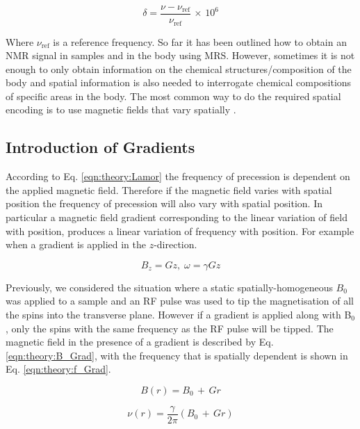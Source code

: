 \begin{equation}
    \delta = \frac{\nu - \nu_{\textrm{ref}}}{\nu_\textrm{ref}} \, \times \, 10^6
    \label{eqn:theory:chemshift}
\end{equation}

Where $\nu_{\textrm{ref}}$ is a reference frequency. So far it has been outlined how to obtain an \ac{NMR} signal in samples and in the body using MRS. However, sometimes it is not enough to only obtain information on the chemical structures/composition of the body and spatial information is also needed to interrogate chemical compositions of specific areas in the body. The most common way to do the required spatial encoding is to use magnetic fields that vary spatially \cite{Haacke2014MagneticDesign}. 

\subsection{Introduction of Gradients}

According to Eq. \ref{eqn:theory:Lamor} the frequency of precession is dependent on the applied magnetic field. Therefore if the magnetic field varies with spatial position the frequency of precession will also vary with spatial position. In particular a magnetic field gradient corresponding to the linear variation of field with position, produces a linear variation of frequency with position. For example when a gradient is applied in the $z$-direction.

\begin{equation}
    B_z = Gz,\; \omega = \gamma Gz 
\end{equation}

Previously, we considered the situation where a static spatially-homogeneous $B_0$ was applied to a sample and an \ac{RF} pulse was used to tip the magnetisation of all the spins into the transverse plane. However if a gradient is applied along with B$_0$, only the spins with the same frequency as the \ac{RF} pulse will be tipped. The magnetic field in the presence of a gradient is described by Eq. \ref{eqn:theory:B_Grad}, with the frequency that is spatially dependent is shown in Eq. \ref{eqn:theory:f_Grad}.

\begin{equation}
    B(r) = B_0 \, + \, Gr
    \label{eqn:theory:B_Grad}
\end{equation}

\begin{equation}
    \nu(r) = \frac{\gamma}{2\pi}(B_0 \, + \, Gr)
    \label{eqn:theory:f_Grad}
\end{equation}

